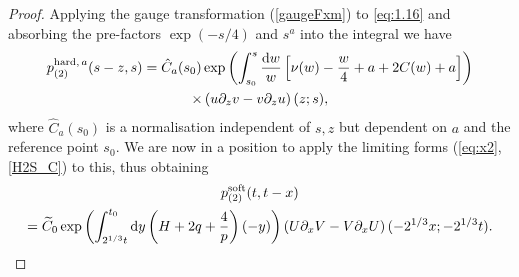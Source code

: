 \documentclass[10pt,reqno]{amsart}
\theoremstyle{plain}
\theoremstyle{definition}
\theoremstyle{remark}
\begin{document}
\begin{proof}
Applying the gauge transformation (\ref{gaugeFxm}) to \eqref{eq:1.16} and absorbing the pre-factors $ \exp(-s/4) $ 
and $ s^{a} $ into the integral we have
\begin{multline*}
  p_{(2)}^{{\rm hard,}\, a} (s-z,s) = \hat{C}_a(s_0) \exp\left( \int^{s}_{s_0} \frac{{\rm d}w}{w} \left[\nu(w)-\frac{w}{4}+a+2C(w)+a\right] \right)
\\ \times
		\left( u\partial_z v - v\partial_z u \right)(z;s) ,
\end{multline*}
where $ \hat{C}_a(s_0) $ is a normalisation independent of $ s,z $ but dependent on $a$ and the reference point $ s_0 $.
We are now in a position to apply the limiting forms (\ref{eq:x2},\ref{H2S_C}) to this, thus obtaining
\begin{multline}
  p_{(2)}^{{\rm soft}} (t,t-x) 
\\
     = \widetilde{C}_0 \exp \left( \int_{2^{1/3}t}^{t_0} {\rm d}y \left( H + 2q + \frac{4}{p} \right) (-y) \right) 
	  	\left( U\partial_{x}V-V\partial_{x}U \right)( -2^{1/3}x; -2^{1/3}t).  
\label{eq:sn}
\end{multline}


\end{proof}
\end{document}
